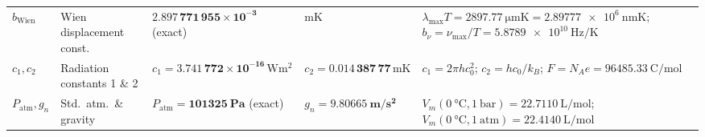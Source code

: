 \documentclass[10pt,twoside,openany,letterpaper]{book}
\begin{document}
\begin{quicksheet}
\begin{formulacard}
\begin{tabularx}{\linewidth}{@{}l l l l X@{}}
$b_{\mathrm{Wien}}$ & Wien displacement const. & $\mathbf{2.897\,771\,955\times 10^{-3}}$ (exact) & $\si{\meter\kelvin}$ & $\lambda_{\max}T = \SI{2897.77}{\micro\meter\kelvin} = \SI{2.89777e6}{\nano\meter\kelvin}$; $b_{\nu} = \nu_{\max}/T = \SI{5.8789e10}{\hertz\per\kelvin}$ \\
$c_1, c_2$ & Radiation constants 1 \& 2 & $c_1 = \mathbf{3.741\,772\times 10^{-16}}\,\si{\watt\square\meter}$ & $c_2 = \mathbf{0.014\,387\,77}\,\si{\meter\kelvin}$ & $c_1 = 2\pi h c_0^2$; $c_2 = h c_0 / k_B$; $F = N_A e = \SI{96485.33}{\coulomb\per\mole}$ \\
$P_{\mathrm{atm}}, g_n$ & Std.\ atm.\ \& gravity & $P_{\mathrm{atm}} = \mathbf{\SI{101325}{\pascal}}$ (exact) & $g_n = \mathbf{\SI{9.80665}{\meter\per\square\second}}$ & $V_m(\SI{0}{\celsius},\SI{1}{\bar}) = \SI{22.7110}{\liter\per\mole}$; $V_m(\SI{0}{\celsius},\SI{1}{\text{atm}}) = \SI{22.4140}{\liter\per\mole}$ \\
\bottomrule
\end{tabularx}
\end{formulacard}


\end{quicksheet}
\end{document}
